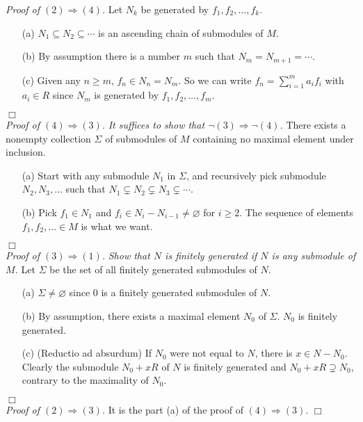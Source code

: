 \documentclass{article}
\begin{document}
\emph{Proof of $(2) \Rightarrow (4)$.}
Let $N_k$ be generated by $f_1, f_2, \ldots, f_k$.
\begin{enumerate}
\item[(a)]
$N_1 \subseteq N_2 \subseteq \cdots$ is an ascending chain of submodules of $M$.
\item[(b)]
By assumption there is a number $m$ such that $N_m = N_{m+1} = \cdots$.
\item[(c)]
Given any $n \geq m$, $f_n \in N_n = N_m$.
So we can write $f_n = \sum_{i=1}^{m} a_i f_i$ with $a_i \in R$
since $N_m$ is generated by $f_1, f_2, \ldots, f_m$.
\end{enumerate}
$\Box$ \\

\emph{Proof of $(4) \Rightarrow (3)$.}
\emph{It suffices to show that $\neg (3) \Rightarrow \neg (4)$.}
There exists a nonempty collection
$\Sigma$ of submodules of $M$ containing no maximal element under inclusion.
\begin{enumerate}
\item[(a)]
Start with any submodule $N_1$ in $\Sigma$,
and recursively pick submodule $N_2, N_3, \ldots$ such that
$N_1 \subsetneq N_2 \subsetneq N_3 \subsetneq \cdots$.
\item[(b)]
Pick $f_1 \in N_1$ and $f_i \in N_i - N_{i-1} \neq \varnothing$ for $i \geq 2$.
The sequence of elements $f_1, f_2, \ldots \in M$ is what we want.
\end{enumerate}
$\Box$ \\

\emph{Proof of $(3) \Rightarrow (1)$.}
\emph{Show that $N$ is finitely generated if $N$ is any submodule of $M$.}
Let $\Sigma$ be the set of all finitely generated submodules of $N$.
\begin{enumerate}
\item[(a)]
$\Sigma \neq \varnothing$ since $0$ is a finitely generated submodules of $N$.
\item[(b)]
By assumption, there exists a maximal element $N_0$ of $\Sigma$.
$N_0$ is finitely generated.
\item[(c)]
(Reductio ad absurdum)
If $N_0$ were not equal to $N$, there is $x \in N - N_0$.
Clearly the submodule $N_0 + xR$ of $N$ is finitely generated and
$N_0 + xR \supsetneq N_0$, contrary to the maximality of $N_0$.
\end{enumerate}
$\Box$ \\

\emph{Proof of $(2) \Rightarrow (3)$.}
It is the part (a) of the proof of $(4) \Rightarrow (3)$.
$\Box$ \\
\end{document}
